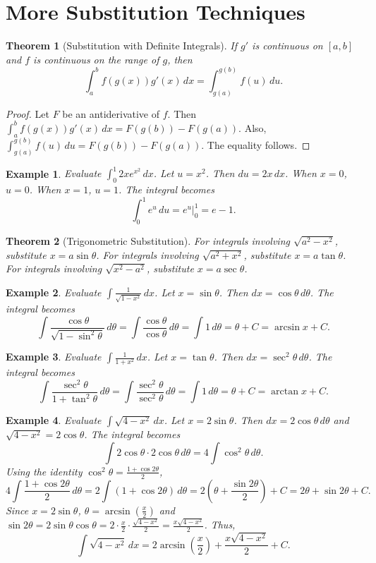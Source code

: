 \documentclass[11pt,a4paper]{article}
\newtheorem{example}{Example}
\newtheorem{theorem}{Theorem}
\begin{document}
\section{More Substitution Techniques}
\begin{theorem}[Substitution with Definite Integrals]
If $g'$ is continuous on $[a, b]$ and $f$ is continuous on the range of $g$, then
\[
\int_a^b f(g(x)) g'(x) \, dx = \int_{g(a)}^{g(b)} f(u) \, du.
\]
\end{theorem}
\begin{proof}
Let $F$ be an antiderivative of $f$. Then $\int_a^b f(g(x)) g'(x) \, dx = F(g(b)) - F(g(a))$. Also, $\int_{g(a)}^{g(b)} f(u) \, du = F(g(b)) - F(g(a))$. The equality follows.
\end{proof}
\begin{example}
Evaluate $\displaystyle \int_0^1 2x e^{x^2} \, dx$.
Let $u = x^2$. Then $du = 2x \, dx$. When $x = 0$, $u = 0$. When $x = 1$, $u = 1$. The integral becomes
\[
\int_0^1 e^u \, du = e^u \Big|_0^1 = e - 1.
\]
\end{example}
\begin{theorem}[Trigonometric Substitution]
For integrals involving $\sqrt{a^2 - x^2}$, substitute $x = a \sin \theta$.
For integrals involving $\sqrt{a^2 + x^2}$, substitute $x = a \tan \theta$.
For integrals involving $\sqrt{x^2 - a^2}$, substitute $x = a \sec \theta$.
\end{theorem}
\begin{example}
Evaluate $\displaystyle \int \frac{1}{\sqrt{1 - x^2}} \, dx$.
Let $x = \sin \theta$. Then $dx = \cos \theta \, d\theta$. The integral becomes
\[
\int \frac{\cos \theta}{\sqrt{1 - \sin^2 \theta}} \, d\theta = \int \frac{\cos \theta}{\cos \theta} \, d\theta = \int 1 \, d\theta = \theta + C = \arcsin x + C.
\]
\end{example}
\begin{example}
Evaluate $\displaystyle \int \frac{1}{1 + x^2} \, dx$.
Let $x = \tan \theta$. Then $dx = \sec^2 \theta \, d\theta$. The integral becomes
\[
\int \frac{\sec^2 \theta}{1 + \tan^2 \theta} \, d\theta = \int \frac{\sec^2 \theta}{\sec^2 \theta} \, d\theta = \int 1 \, d\theta = \theta + C = \arctan x + C.
\]
\end{example}
\begin{example}
Evaluate $\displaystyle \int \sqrt{4 - x^2} \, dx$.
Let $x = 2 \sin \theta$. Then $dx = 2 \cos \theta \, d\theta$ and $\sqrt{4 - x^2} = 2 \cos \theta$. The integral becomes
\[
\int 2 \cos \theta \cdot 2 \cos \theta \, d\theta = 4 \int \cos^2 \theta \, d\theta.
\]
Using the identity $\cos^2 \theta = \frac{1 + \cos 2\theta}{2}$,
\[
4 \int \frac{1 + \cos 2\theta}{2} \, d\theta = 2 \int (1 + \cos 2\theta) \, d\theta = 2 \left( \theta + \frac{\sin 2\theta}{2} \right) + C = 2\theta + \sin 2\theta + C.
\]
Since $x = 2 \sin \theta$, $\theta = \arcsin\left(\frac{x}{2}\right)$ and $\sin 2\theta = 2 \sin \theta \cos \theta = 2 \cdot \frac{x}{2} \cdot \frac{\sqrt{4 - x^2}}{2} = \frac{x \sqrt{4 - x^2}}{2}$. Thus,
\[
\int \sqrt{4 - x^2} \, dx = 2 \arcsin\left(\frac{x}{2}\right) + \frac{x \sqrt{4 - x^2}}{2} + C.
\]
\end{example}
\end{document}
